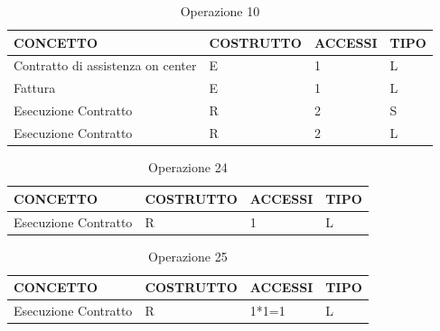 \begin{table}[H]
\centering
\caption{Operazione 10}
\begin{tabular}{llll}
\\ \hline
\multicolumn{1}{|l|}{\textbf{CONCETTO}} & \multicolumn{1}{l|}{\textbf{COSTRUTTO}} & \multicolumn{1}{l|}{\textbf{ACCESSI}} & \multicolumn{1}{l|}{\textbf{TIPO}} \\ \hline
\multicolumn{1}{|l|}{Contratto di assistenza on center}
& \multicolumn{1}{l|}{E}                  & \multicolumn{1}{l|}{1}                & \multicolumn{1}{l|}{L}             \\ \hline
\multicolumn{1}{|l|}{Fattura}             & \multicolumn{1}{l|}{E}                  & \multicolumn{1}{l|}{1}                & \multicolumn{1}{l|}{L}             \\ \hline
\multicolumn{1}{|l|}{Esecuzione Contratto}     & \multicolumn{1}{l|}{R}                  & \multicolumn{1}{l|}{2}                & \multicolumn{1}{l|}{S}             \\ \hline
\multicolumn{1}{|l|}{Esecuzione Contratto}
& \multicolumn{1}{l|}{R}                  & \multicolumn{1}{l|}{2}                & \multicolumn{1}{l|}{L}             \\ \hline
\end{tabular}
\end{table}

\begin{table}[H]
\centering
\caption{Operazione 24}
\begin{tabular}{llll}
\\ \hline
\multicolumn{1}{|l|}{\textbf{CONCETTO}} & \multicolumn{1}{l|}{\textbf{COSTRUTTO}} & \multicolumn{1}{l|}{\textbf{ACCESSI}} & \multicolumn{1}{l|}{\textbf{TIPO}} \\ \hline
\multicolumn{1}{|l|}{Esecuzione Contratto}
& \multicolumn{1}{l|}{R}                  & \multicolumn{1}{l|}{1}                & \multicolumn{1}{l|}{L}             \\ \hline
\end{tabular}
\end{table}

\begin{table}[H]
\centering
\caption{Operazione 25}
\begin{tabular}{llll}
\\ \hline
\multicolumn{1}{|l|}{\textbf{CONCETTO}} & \multicolumn{1}{l|}{\textbf{COSTRUTTO}} & \multicolumn{1}{l|}{\textbf{ACCESSI}} & \multicolumn{1}{l|}{\textbf{TIPO}} \\ \hline
\multicolumn{1}{|l|}{Esecuzione Contratto}
& \multicolumn{1}{l|}{R}                  & \multicolumn{1}{l|}{1*1=1}                & \multicolumn{1}{l|}{L}             \\ \hline
\end{tabular}
\end{table}

